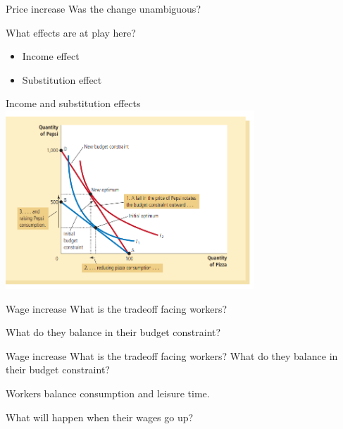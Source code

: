 \documentclass[aspectratio=169]{beamer}
\begin{document}
\begin{frame}{Price increase}
    Was the change unambiguous?

    \vspace{2mm}

    What effects are at play here?
    \begin{itemize}
        \item Income effect
        \item Substitution effect
    \end{itemize}
\end{frame}

\begin{frame}{Income and substitution effects}
    \centering
        \includegraphics[width = 0.7\textwidth,keepaspectratio]{../figs/effects.png}
\end{frame}

\begin{frame}{Wage increase}
    What is the tradeoff facing workers?

    \vspace{2mm}

    What do they balance in their budget constraint?
\end{frame}

\begin{frame}{Wage increase}
    What is the tradeoff facing workers?  What do they balance in their budget constraint?

    \vspace{2mm}

    Workers balance consumption and leisure time.

    \vspace{2mm}

    What will happen when their wages go up?

\end{frame}
\end{document}
